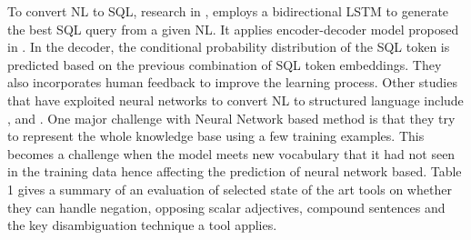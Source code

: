 \documentclass[review]{elsarticle}
\begin{document}
\par To convert NL to SQL, research in \citep{sema201},  employs a bidirectional LSTM to generate the best SQL query from a given NL. It applies encoder-decoder model proposed in \citep{sema2015}. In the decoder, the conditional probability distribution of the SQL token is predicted based on the previous combination of SQL token embeddings. They also incorporates human feedback to improve the learning process. Other studies that have exploited neural networks to convert NL to structured language include \citep{sema20p},\citep{Yu2018} and \citep{wera2018}. One major challenge with Neural Network based method is that they try to represent the whole knowledge base using a few training examples. This becomes a challenge when the model meets new vocabulary that  it had not seen in the training data hence affecting the prediction of neural network based. Table 1 gives a summary of  an evaluation of selected state of the art tools on whether they can handle negation, opposing scalar adjectives, compound sentences and the key disambiguation technique a tool applies.
\end{document}

